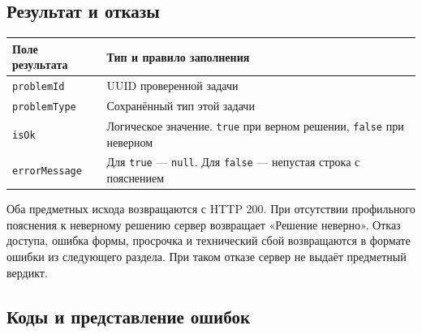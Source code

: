 \documentclass[12pt,a4paper]{article}
\begin{document}
\subsection{Результат и отказы}\label{ux440ux435ux437ux443ux43bux44cux442ux430ux442-ux438-ux43eux442ux43aux430ux437ux44b}

\hypertarget{результат-и-отказы}{}

{\def\LTcaptype{none} %
\begin{longtable}[]{@{}
  >{\raggedright\arraybackslash}p{}
  >{\raggedright\arraybackslash}p{}@{}}
\toprule\noalign{}
\begin{minipage}[b]{\linewidth}\raggedright
Поле результата
\end{minipage} & \begin{minipage}[b]{\linewidth}\raggedright
Тип и правило заполнения
\end{minipage} \\
\midrule\noalign{}
\endhead
\bottomrule\noalign{}
\endlastfoot
\texttt{problemId} & UUID проверенной задачи \\
\texttt{problemType} & Сохранённый тип этой задачи \\
\texttt{isOk} & Логическое значение. \texttt{true} при верном решении, \texttt{false} при неверном \\
\texttt{errorMessage} & Для \texttt{true} --- \texttt{null}. Для \texttt{false} --- непустая строка с пояснением \\
\end{longtable}
}

Оба предметных исхода возвращаются с HTTP 200. При отсутствии профильного пояснения к неверному решению сервер возвращает «Решение неверно». Отказ доступа, ошибка формы, просрочка и технический сбой возвращаются в формате ошибки из следующего раздела. При таком отказе сервер не выдаёт предметный вердикт.

\subsection{Коды и представление ошибок}\label{ux43aux43eux434ux44b-ux438-ux43fux440ux435ux434ux441ux442ux430ux432ux43bux435ux43dux438ux435-ux43eux448ux438ux431ux43eux43a}

\hypertarget{коды-и-представление-ошибок}{}
\end{document}
